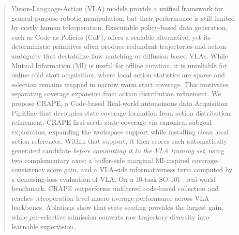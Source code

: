 \documentclass{article}
\begin{document}
    
\begin{abstract}
   Vision-Language-Action (VLA) models provide a unified framework for general purpose robotic manipulation, but their performance is still limited by costly human teleoperation. Executable policy-based data generation, such as Code as Policies (CaP), offers a scalable alternative, yet its deterministic primitives often produce redundant trajectories and action ambiguity that destabilize flow matching or diffusion based VLAs. While Mutual Information (MI) is useful for offline curation, it is unreliable for online cold start acquisition, where local action statistics are sparse and selection remains trapped in narrow warm start coverage. This motivates separating coverage expansion from action distribution refinement. We propose CRAPE, a Code-based Real-world autonomous data Acquisition PipEline that decouples state coverage formation from action distribution refinement. CRAPE first seeds state coverage via canonical subgoal exploration, expanding the workspace support while installing clean local action references. Within that support, it then scores each automatically generated candidate \emph{before committing it to the VLA training set}, using two complementary axes: a buffer-side marginal MI-inspired coverage-consistency score gain, and a VLA-side informativeness term computed by a denoising-loss evaluation of VLA. On a 10-task SO-101~\citep{cadene2024lerobot} real-world benchmark, CRAPE outperforms unfiltered code-based collection and reaches teleoperation-level macro-average performance across VLA backbones. Ablations show that state seeding provides the largest gain, while pre-selective admission converts raw trajectory diversity into learnable supervision.
\end{abstract}
\end{document}
